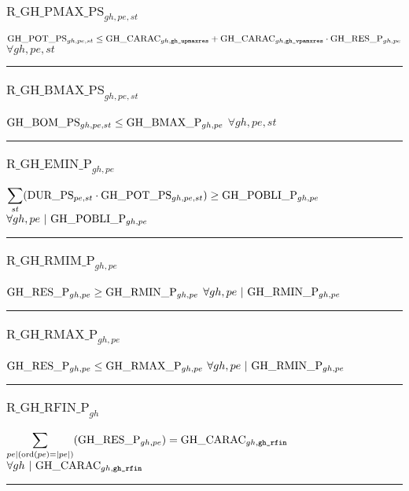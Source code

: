 \documentclass[11pt]{article}
\begin{document}
\subsubsection*{$\text{R\_GH\_PMAX\_PS}_{gh, pe, st}$} \label{R_GH_PMAX_PS}
$
\textcolor{black}{\text{GH\_POT\_PS}}_{gh, pe, st} \leq \textcolor{black}{\text{GH\_CARAC}}_{gh, \texttt{gh\_upmaxres}} + \textcolor{black}{\text{GH\_CARAC}}_{gh, \texttt{gh\_vpamxres}} \cdot \textcolor{black}{\text{GH\_RES\_P}}_{gh, pe}
$
\hfill
$
\forall{ gh, pe, st} 
$ \\
\hrule 
\subsubsection*{$\text{R\_GH\_BMAX\_PS}_{gh, pe, st}$} \label{R_GH_BMAX_PS}
$
\textcolor{black}{\text{GH\_BOM\_PS}}_{gh, pe, st} \leq \textcolor{black}{\text{GH\_BMAX\_P}}_{gh, pe}
$
\hfill
$
\forall{ gh, pe, st} 
$ \\
\hrule 
\subsubsection*{$\text{R\_GH\_EMIN\_P}_{gh, pe}$} \label{R_GH_EMIN_P}
$
\displaystyle \sum_{st} ( \textcolor{black}{\text{DUR\_PS}}_{pe, st} \cdot \textcolor{black}{\text{GH\_POT\_PS}}_{gh, pe, st} )  \geq \textcolor{black}{\text{GH\_POBLI\_P}}_{gh, pe}
$
\hfill
$
\forall{ gh, pe}  ~ | ~\textcolor{black}{\text{GH\_POBLI\_P}}_{gh, pe}
$ \\
\hrule 
\subsubsection*{$\text{R\_GH\_RMIM\_P}_{gh, pe}$} \label{R_GH_RMIM_P}
$
\textcolor{black}{\text{GH\_RES\_P}}_{gh, pe} \geq \textcolor{black}{\text{GH\_RMIN\_P}}_{gh, pe}
$
\hfill
$
\forall{ gh, pe}  ~ | ~\textcolor{black}{\text{GH\_RMIN\_P}}_{gh, pe}
$ \\
\hrule 
\subsubsection*{$\text{R\_GH\_RMAX\_P}_{gh, pe}$} \label{R_GH_RMAX_P}
$
\textcolor{black}{\text{GH\_RES\_P}}_{gh, pe} \leq \textcolor{black}{\text{GH\_RMAX\_P}}_{gh, pe}
$
\hfill
$
\forall{ gh, pe}  ~ | ~\textcolor{black}{\text{GH\_RMIN\_P}}_{gh, pe}
$ \\
\hrule 
\subsubsection*{$\text{R\_GH\_RFIN\_P}_{gh}$} \label{R_GH_RFIN_P}
$
\displaystyle \sum_{pe |  (  \text{ord}( pe )   =   | pe |  ) } ( \textcolor{black}{\text{GH\_RES\_P}}_{gh, pe} )  = \textcolor{black}{\text{GH\_CARAC}}_{gh, \texttt{gh\_rfin}}
$
\hfill
$
\forall{ gh}  ~ | ~\textcolor{black}{\text{GH\_CARAC}}_{gh, \texttt{gh\_rfin}}
$ \\
\hrule 
\end{document}
